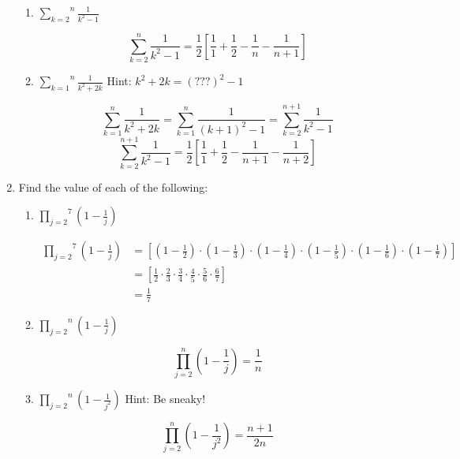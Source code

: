 \documentclass[class=article, crop=false]{standalone}
\def\inlinesum#1#2{\overset{#2}{\underset{#1}{\sum}}}
\def\inlineprod#1#2{\overset{#2}{\underset{#1}{\prod}}}
\begin{document}
\begin{enumerate}
\begin{enumerate}
	  \item
		$\inlinesum{k=2}{n}\frac1{k^2-1}$
	
		$$\inlinesum{k=2}{n}\frac1{k^2-1}= \frac{1}{2}\left[\frac{1}{1}+\frac{1}{2} - \frac{1}{n} - \frac{1}{n+1}\right]$$
	
	  \item
		$\inlinesum{k=1}{n}\frac1{k^2+2k}$
		\hspace{10pt}Hint: $k^2+2k=(???)^2-1$
	
		$$\inlinesum{k=1}{n} \frac{1}{k^2+2k} = \inlinesum{k=1}{n}\frac{1}{(k+1)^2 - 1} = \inlinesum{k=2}{n+1}\frac{1}{k^2 - 1}$$
		$$\inlinesum{k=2}{n+1}\frac{1}{k^2 - 1} = \frac{1}{2} \left[\frac{1}{1} + \frac{1}{2} - \frac{1}{n+1} - \frac{1}{n+2}\right]$$
	
	  \end{enumerate}
	
	\item
	  Find the value of each of the following:
	
	  \begin{enumerate}
	
	  \item
		$\inlineprod{j=2}{7}\left(1-\frac1j\right)$
	
		\begin{align*}
		  \inlineprod{j=2}{7}\left(1-\frac1j\right) &= \left[\left(1-\frac{1}{2}\right)\cdot \left(1-\frac{1}{3}\right)\cdot \left(1-\frac{1}{4}\right)\cdot \left(1-\frac{1}{5}\right)\cdot \left(1-\frac{1}{6}\right)\cdot \left(1-\frac{1}{7}\right)\right] \\
		&= \left[\frac{1}{2}\cdot\frac{2}{3}\cdot\frac{3}{4}\cdot\frac{4}{5}\cdot\frac{5}{6}\cdot\frac{6}{7}\right] \\
		&= \frac{1}{7}
		\end{align*}
		
	  \item
		$\inlineprod{j=2}{n}\left(1-\frac1j\right)$
	
		$$\inlineprod{j=2}{n}\left(1-\frac1j\right) = \frac{1}{n}$$
	
	  \item
		$\inlineprod{j=2}{n}\left(1-\frac1{j^2}\right)$
		\hspace{10pt}Hint: Be sneaky!
	
		$$\inlineprod{j=2}{n}\left(1-\frac1{j^2}\right) = \frac{n+1}{2n}$$
	
	  \end{enumerate}
	

\end{enumerate}
\end{document}
